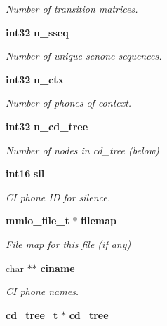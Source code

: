 \begin{DoxyCompactItemize}
\begin{DoxyCompactList}\small\item\em \-Number of transition matrices. \end{DoxyCompactList}\item 
{\bf int32} {\bf n\-\_\-sseq}\label{structbin__mdef__s_ab9dad211cbc12eb6f848482bcf78d47f}

\begin{DoxyCompactList}\small\item\em \-Number of unique senone sequences. \end{DoxyCompactList}\item 
{\bf int32} {\bf n\-\_\-ctx}\label{structbin__mdef__s_a31b5cda5136c6f72816da8889719bfe2}

\begin{DoxyCompactList}\small\item\em \-Number of phones of context. \end{DoxyCompactList}\item 
{\bf int32} {\bf n\-\_\-cd\-\_\-tree}\label{structbin__mdef__s_ad625c3c55d5f42ed275b8b5638a6d80b}

\begin{DoxyCompactList}\small\item\em \-Number of nodes in cd\-\_\-tree (below) \end{DoxyCompactList}\item 
{\bf int16} {\bf sil}\label{structbin__mdef__s_a9071b7698132c1c2ce92a6f742e1c82f}

\begin{DoxyCompactList}\small\item\em \-C\-I phone \-I\-D for silence. \end{DoxyCompactList}\item 
{\bf mmio\-\_\-file\-\_\-t} $\ast$ {\bf filemap}\label{structbin__mdef__s_a3358a80c50bf3f62417596553adf9c5e}

\begin{DoxyCompactList}\small\item\em \-File map for this file (if any) \end{DoxyCompactList}\item 
char $\ast$$\ast$ {\bf ciname}\label{structbin__mdef__s_afdd0df913746b0656186fc8c3e8a9206}

\begin{DoxyCompactList}\small\item\em \-C\-I phone names. \end{DoxyCompactList}\item 
{\bf cd\-\_\-tree\-\_\-t} $\ast$ {\bf cd\-\_\-tree}\label{structbin__mdef__s_a0642be2bb56149689ad3fc1dad1e5d55}


\end{DoxyCompactItemize}
